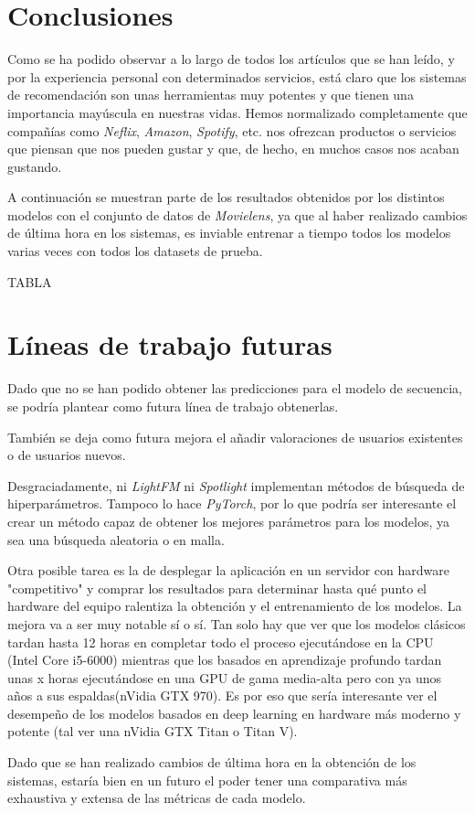 
\section{Conclusiones}\label{conclusiones}
Como se ha podido observar a lo largo de todos los artículos que se han leído, y por la experiencia personal con determinados servicios, está claro que los sistemas de recomendación son unas herramientas muy potentes y que tienen una importancia mayúscula en nuestras vidas. Hemos normalizado completamente que compañías como \textit{Neflix}, \textit{Amazon}, \textit{Spotify}, etc. nos ofrezcan productos o servicios que piensan que nos pueden gustar y que, de hecho, en muchos casos nos acaban gustando.

A continuación se muestran parte de los resultados obtenidos por los distintos modelos con el conjunto de datos de \textit{Movielens}, ya que al haber realizado cambios de última hora en los sistemas, es inviable entrenar a tiempo todos los modelos varias veces con todos los datasets de prueba.

TABLA

\section{Líneas de trabajo futuras}\label{lineas-futuras}
Dado que no se han podido obtener las predicciones para el modelo de secuencia, se podría plantear como futura línea de trabajo obtenerlas.

También se deja como futura mejora el añadir valoraciones de usuarios existentes o de usuarios nuevos.

Desgraciadamente, ni \textit{LightFM} ni \textit{Spotlight} implementan métodos de búsqueda de hiperparámetros. Tampoco lo hace \textit{PyTorch}, por lo que podría ser interesante el crear un método capaz de obtener los mejores parámetros para los modelos, ya sea una búsqueda aleatoria o en malla.

Otra posible tarea es la de desplegar la aplicación en un servidor con hardware "competitivo" y comprar los resultados para determinar hasta qué punto el hardware del equipo ralentiza la obtención y el entrenamiento de los modelos. La mejora va a ser muy notable sí o sí. Tan solo hay que ver que los modelos clásicos tardan hasta 12 horas en completar todo el proceso ejecutándose en la CPU (Intel Core i5-6000) mientras que los basados en aprendizaje profundo tardan unas x horas ejecutándose en una GPU de gama media-alta pero con ya unos años a sus espaldas(nVidia GTX 970). Es por eso que sería interesante ver el desempeño de los modelos basados en deep learning en hardware más moderno y potente (tal ver una nVidia GTX Titan o Titan V).

Dado que se han realizado cambios de última hora en la obtención de los sistemas, estaría bien en un futuro el poder tener una comparativa más exhaustiva y extensa de las métricas de cada modelo.
